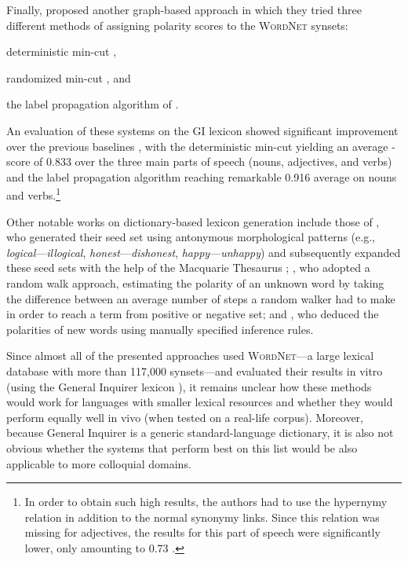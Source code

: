 Finally, \citet{Rao:09} proposed another graph-based approach in which
they tried three different methods of assigning polarity scores to the
\textsc{WordNet} synsets:
\begin{inparaenum}
\item deterministic min-cut \cite{Blum:01},
\item randomized min-cut \cite{Blum:04}, and
\item the label propagation algorithm of \citet{Zhu:02}.
\end{inparaenum}
An evaluation of these systems on the GI lexicon \cite{Stone:66}
showed significant improvement over the previous baselines
\cite{Kamps:04,Kim:06}, with the deterministic min-cut yielding an
average \F{}-score of 0.833 over the three main parts of speech
(nouns, adjectives, and verbs) and the label propagation algorithm
reaching remarkable 0.916 average \F{} on nouns and verbs.\footnote{In
  order to obtain such high results, the authors had to use the
  hypernymy relation in addition to the normal synonymy links.  Since
  this relation was missing for adjectives, the results for this part
  of speech were significantly lower, only amounting to 0.73 \F{}.}

Other notable works on dictionary-based lexicon generation include
those of \citet{Mohammad:09}, who generated their seed set using
antonymous morphological patterns (e.g.,
\emph{logical}---\emph{illogical}, \emph{honest}---\emph{dishonest},
\emph{happy}---\emph{unhappy}) and subsequently expanded these seed
sets with the help of the Macquarie Thesaurus \cite{Bernard:86};
\citet{Awadallah:10}, who adopted a random walk approach, estimating
the polarity of an unknown word by taking the difference between an
average number of steps a random walker had to make in order to reach
a term from positive or negative set; and \citet{Dragut:10}, who
deduced the polarities of new words using manually specified inference
rules.

Since almost all of the presented approaches used \textsc{WordNet}---a
large lexical database with more than 117,000 synsets---and evaluated
their results in vitro (using the General Inquirer lexicon
\cite{Stone:66}), it remains unclear how these methods would work for
languages with smaller lexical resources and whether they would
perform equally well in vivo (when tested on a real-life corpus).
Moreover, because General Inquirer is a generic standard-language
dictionary, it is also not obvious whether the systems that perform
best on this list would be also applicable to more colloquial domains.

